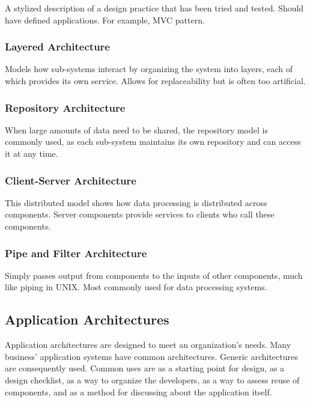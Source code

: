 \documentclass[12pt]{article}
\begin{document}
A stylized description of a design practice that has been tried and tested. Should have defined applications. For example, MVC pattern.

\subsubsection*{Layered Architecture}

Models how sub-systems interact by organizing the system into layers, each of which provides its own service. Allows for replaceability but is often too artificial.

\subsubsection*{Repository Architecture}

When large amounts of data need to be shared, the repository model is commonly used, as each sub-system maintains its own repository and can access it at any time.

\subsubsection*{Client-Server Architecture}

This distributed model shows how data processing is distributed across components. Server components provide services to clients who call these components.

\subsubsection*{Pipe and Filter Architecture}

Simply passes output from components to the inputs of other components, much like piping in UNIX. Most commonly used for data processing systems.

\subsection*{Application Architectures}

Application architectures are designed to meet an organization's needs. Many business' application systems have common architectures. Generic architectures are consequently used. Common uses are as a starting point for design, as a design checklist, as a way to organize the developers, as a way to assess reuse of components, and as a method for discussing about the application itself.
\end{document}
